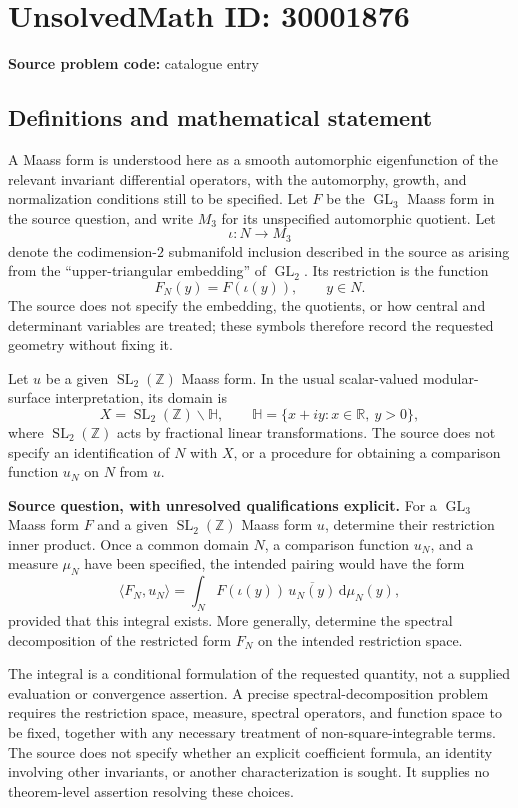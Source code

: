 \documentclass[11pt]{article}
\newcommand{\Z}{\mathbb{Z}}
\newcommand{\R}{\mathbb{R}}
\begin{document}
\section*{UnsolvedMath ID: 30001876}
\textbf{Source problem code:} catalogue entry
\subsection{Definitions and mathematical statement}
A Maass form is understood here as a smooth automorphic eigenfunction of the relevant invariant differential operators, with the automorphy, growth, and normalization conditions still to be specified. Let \(F\) be the \(\operatorname{GL}_3\) Maass form in the source question, and write \(M_3\) for its unspecified automorphic quotient. Let
\[
\iota:N\longrightarrow M_3
\]
denote the codimension-\(2\) submanifold inclusion described in the source as arising from the ``upper-triangular embedding'' of \(\operatorname{GL}_2\). Its restriction is the function
\[
F_N(y)=F(\iota(y)),\qquad y\in N.
\]
The source does not specify the embedding, the quotients, or how central and determinant variables are treated; these symbols therefore record the requested geometry without fixing it.

Let \(u\) be a given \(\operatorname{SL}_2(\Z)\) Maass form. In the usual scalar-valued modular-surface interpretation, its domain is
\[
X=\operatorname{SL}_2(\Z)\backslash\mathbb H,
\qquad \mathbb H=\{x+iy:x\in\R,\ y>0\},
\]
where \(\operatorname{SL}_2(\Z)\) acts by fractional linear transformations. The source does not specify an identification of \(N\) with \(X\), or a procedure for obtaining a comparison function \(u_N\) on \(N\) from \(u\).

\textbf{Source question, with unresolved qualifications explicit.} For a \(\operatorname{GL}_3\) Maass form \(F\) and a given \(\operatorname{SL}_2(\Z)\) Maass form \(u\), determine their restriction inner product. Once a common domain \(N\), a comparison function \(u_N\), and a measure \(\mu_N\) have been specified, the intended pairing would have the form
\[
\langle F_N,u_N\rangle
=\int_N F(\iota(y))\,\overline{u_N(y)}\,\mathrm d\mu_N(y),
\]
provided that this integral exists. More generally, determine the spectral decomposition of the restricted form \(F_N\) on the intended restriction space.

The integral is a conditional formulation of the requested quantity, not a supplied evaluation or convergence assertion. A precise spectral-decomposition problem requires the restriction space, measure, spectral operators, and function space to be fixed, together with any necessary treatment of non-square-integrable terms. The source does not specify whether an explicit coefficient formula, an identity involving other invariants, or another characterization is sought. It supplies no theorem-level assertion resolving these choices.
\end{document}
